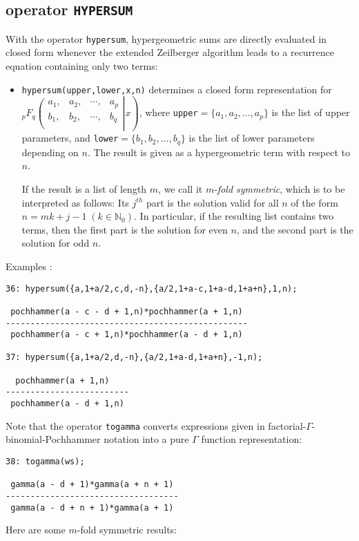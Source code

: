 \subsection{\REDUCE{} operator \texttt{HYPERSUM}}
\hypertarget{operator:HYPERSUM}{}

With the operator \texttt{hypersum}, hypergeometric sums are directly
evaluated in closed form whenever the extended
Zeilberger algorithm leads to a recurrence equation containing only
two terms:
\begin{itemize}
\item
\texttt{hypersum(upper,lower,x,n)} determines a closed form representation
for
$_{p}F_{q}\left.\left(\begin{array}{cccc}
a_{1},&a_{2},&\cdots,&a_{p}\\
b_{1},&b_{2},&\cdots,&b_{q}\\
            \end{array}\right| x\right)
$, where \texttt{upper}$=\{a_{1}, a_{2}, \ldots, a_{p}\}$
is the list of upper parameters, and
\texttt{lower}$=\{b_{1}, b_{2}, \ldots, b_{q}\}$
is the list of lower parameters depending on $n$. The result is given as a
hypergeometric term with respect to $n$.

If the result is a list of length $m$, we call it $m$-\textsl{fold symmetric},
which is to be interpreted as follows:
Its $j^{th}$ part is the solution valid for all $n$ of the form $n=mk+j-1
\;(k\in\mathbb{N}_0)$.
In particular, if the resulting list contains two terms, then
the first part is the solution for even $n$, and the second part is the
solution for odd $n$.
\end{itemize}
Examples \cite{Koepf:94b}:

{\small
\begin{verbatim}
36: hypersum({a,1+a/2,c,d,-n},{a/2,1+a-c,1+a-d,1+a+n},1,n);

 pochhammer(a - c - d + 1,n)*pochhammer(a + 1,n)
-------------------------------------------------
 pochhammer(a - c + 1,n)*pochhammer(a - d + 1,n)

37: hypersum({a,1+a/2,d,-n},{a/2,1+a-d,1+a+n},-1,n);

  pochhammer(a + 1,n)
-------------------------
 pochhammer(a - d + 1,n)
\end{verbatim}
}\noindent
Note that the operator \texttt{togamma} converts expressions given in
factorial-$\Gamma$-binomial-Pochhammer notation
into a pure $\Gamma$ function representation:

{\small
\begin{verbatim}
38: togamma(ws);

 gamma(a - d + 1)*gamma(a + n + 1)
-----------------------------------
 gamma(a - d + n + 1)*gamma(a + 1)
\end{verbatim}
}\noindent
Here are some $m$-fold symmetric results:

